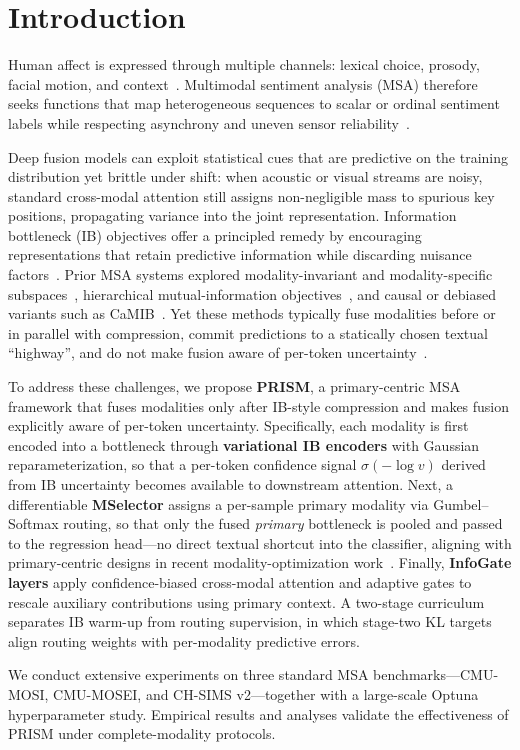\section{Introduction}
\label{sec:intro}

Human affect is expressed through multiple channels: lexical choice, prosody,
facial motion, and context~\citep{zadeh2017tensor,zadeh2018multi}.
Multimodal sentiment analysis (MSA) therefore seeks functions that map
heterogeneous sequences to scalar or ordinal sentiment labels while respecting
asynchrony and uneven sensor reliability~\citep{tsai2019multimodal}.

Deep fusion models can exploit statistical cues that are predictive on the
training distribution yet brittle under shift: when acoustic or visual streams
are noisy, standard cross-modal attention still assigns non-negligible mass to
spurious key positions, propagating variance into the joint representation.
Information bottleneck (IB) objectives offer a principled remedy by encouraging
representations that retain predictive information while discarding nuisance
factors~\citep{alemi2017deep}.
Prior MSA systems explored modality-invariant and modality-specific
subspaces~\citep{hazarika2020misa,yu2021selfmm}, hierarchical mutual-information
objectives~\citep{han2021mmim}, and causal or debiased variants such as
CaMIB~\citep{jiang2025towards}.
Yet these methods typically fuse modalities before or in parallel with
compression, commit predictions to a statically chosen textual ``highway'', and
do not make fusion aware of per-token uncertainty~\citep{mods2026align}.

To address these challenges, we propose \textbf{PRISM}, a primary-centric
MSA framework that fuses modalities only after IB-style compression and makes
fusion explicitly aware of per-token uncertainty.
Specifically, each modality is first encoded into a bottleneck through
\textbf{variational IB encoders} with Gaussian reparameterization, so that a
per-token confidence signal $\sigma(-\log v)$ derived from IB uncertainty
becomes available to downstream attention.
Next, a differentiable \textbf{MSelector} assigns a per-sample primary modality
via Gumbel--Softmax routing, so that only the fused \emph{primary} bottleneck
is pooled and passed to the regression head---no direct textual shortcut into
the classifier, aligning with primary-centric designs in recent
modality-optimization work~\citep{mods2026align}.
Finally, \textbf{InfoGate layers} apply confidence-biased cross-modal attention
and adaptive gates to rescale auxiliary contributions using primary context.
A two-stage curriculum separates IB warm-up from routing supervision, in which
stage-two KL targets align routing weights with per-modality predictive errors.

We conduct extensive experiments on three standard MSA benchmarks---CMU-MOSI,
CMU-MOSEI, and CH-SIMS v2---together with a large-scale Optuna hyperparameter
study. Empirical results and analyses validate the effectiveness of PRISM
under complete-modality protocols.
